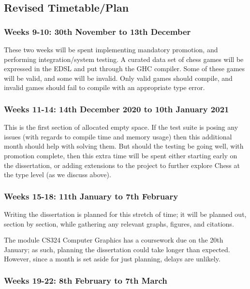\documentclass[12pt, a4paper, bibliography=totocnumbered]{scrartcl}
\begin{document}
\subsection{Revised Timetable/Plan}

\subsubsection{Weeks 9-10: 30th November to 13th December}

These two weeks will be spent implementing mandatory promotion, and performing integration/system testing. A curated data set of chess games will be expressed in the EDSL and put through the GHC compiler. Some of these games will be valid, and some will be invalid. Only valid games should compile, and invalid games should fail to compile with an appropriate type error.

\subsubsection{Weeks 11-14: 14th December 2020 to 10th January 2021}

This is the first section of allocated empty space. If the test suite is posing any issues (with regards to compile time and memory usage) then this additional month should help with solving them. But should the testing be going well, with promotion complete, then this extra time will be spent either starting early on the dissertation, or adding extensions to the project to further explore Chess at the type level (as we discuss above).

\subsubsection{Weeks 15-18: 11th January to 7th February}

Writing the dissertation is planned for this stretch of time; it will be planned out, section by section, while gathering any relevant graphs, figures, and citations.

The module CS324 Computer Graphics has a coursework due on the 20th January; as such, planning the dissertation could take longer than expected. However, since a month is set aside for just planning, delays are unlikely.

\subsubsection{Weeks 19-22: 8th February to 7th March}
\end{document}

